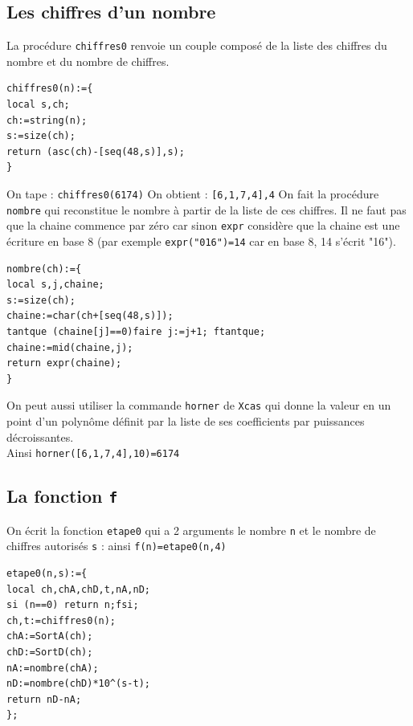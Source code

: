 \documentclass[a4paper,11pt]{book}
\begin{document}
\subsection{Les chiffres d'un nombre}
La proc\'edure {\tt chiffres0} renvoie un couple compos\'e de la liste des 
chiffres du nombre et du nombre de chiffres.
\begin{verbatim}
chiffres0(n):={
local s,ch;
ch:=string(n);
s:=size(ch);
return (asc(ch)-[seq(48,s)],s);
}
\end{verbatim}
On tape :
{\tt chiffres0(6174)}
On obtient :
{\tt [6,1,7,4],4}
On fait la proc\'edure {\tt nombre} qui reconstitue le nombre \`a partir de la
liste de ces chiffres. Il ne faut pas que la chaine commence par z\'ero car 
sinon {\tt expr} consid\`ere que la chaine est une \'ecriture en base 8 (par 
exemple {\tt expr("016")=14} car en base 8, 14 s'\'ecrit "16").
\begin{verbatim}
nombre(ch):={
local s,j,chaine;
s:=size(ch);
chaine:=char(ch+[seq(48,s)]);
tantque (chaine[j]==0)faire j:=j+1; ftantque;
chaine:=mid(chaine,j);
return expr(chaine);
}
\end{verbatim}
On peut aussi utiliser la commande {\tt horner} de {\tt Xcas} qui donne la 
valeur en un point d'un polyn\^ome d\'efinit par la liste de ses coefficients
par puissances d\'ecroissantes.\\
Ainsi  {\tt horner([6,1,7,4],10)=6174}
\subsection{La fonction {\tt f}}
On \'ecrit la fonction {\tt etape0} qui a 2 arguments le nombre {\tt n} et le 
nombre de chiffres autoris\'es {\tt s} : ainsi {\tt f(n)=etape0(n,4)} 
\begin{verbatim}
etape0(n,s):={
local ch,chA,chD,t,nA,nD;
si (n==0) return n;fsi;
ch,t:=chiffres0(n);
chA:=SortA(ch);
chD:=SortD(ch);
nA:=nombre(chA);
nD:=nombre(chD)*10^(s-t);
return nD-nA;
};
\end{verbatim}
\end{document}
